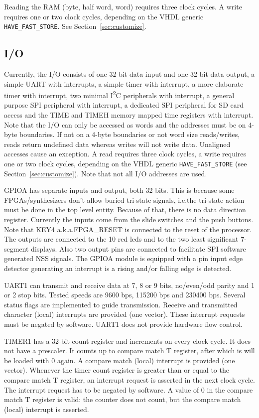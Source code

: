 \documentclass[12pt]{article}
\begin{document}
Reading the RAM (byte, half word, word) requires three clock cycles. A write requires one or two clock cycles, depending on the VHDL generic \lstinline|HAVE_FAST_STORE|. See Section~\ref{sec:customize}.

\subsection{I/O}
\label{sec/io}
Currently, the I/O consists of one 32-bit data input and one 32-bit data output, a simple UART with interrupts, a simple timer with interrupt, a more elaborate timer with interrupt, two minimal I\textsuperscript{2}C peripherals with interrupt, a general purpose SPI peripheral with interrupt, a dedicated SPI peripheral for SD card access and the TIME and TIMEH memory mapped time registers with interrupt. Note that the I/O can only be accessed as words and the addresses must be on 4-byte boundaries. If not on a 4-byte boundaries or not word size reads/writes, reads return undefined data whereas writes will not write data. Unaligned accesses cause an exception. A read requires three clock cycles, a write requires one or two clock cycles, depending on the VHDL generic \lstinline|HAVE_FAST_STORE| (see Section~\ref{sec:customize}). Note that not all I/O addresses are used.

GPIOA has separate inputs and output, both 32 bits. This is because some FPGAs/synthesizers don't allow buried tri-state signals, i.e.\@ the tri-state action must be done in the top level entity. Because of that, there is no data direction register. Currently the inputs come from the slide switches and the push buttons. Note that KEY4 a.k.a.\@ FPGA\_RESET is connected to the reset of the processor. The outputs are connected to the 10 red leds and to the two least significant 7-segment displays. Also two output pins are connected to facilitate SPI software generated NSS signals. The GPIOA module is equipped with a pin input edge detector generating an interrupt is a rising and/or falling edge is detected.

UART1 can transmit and receive data at 7, 8 or 9 bits, no/even/odd parity and 1 or 2 stop bits. Tested speeds are 9600 bps, 115200 bps and 230400 bps. Several status flags are implemented to guide transmission. Receive and transmitted character (local) interrupts are provided (one vector). These interrupt requests must be negated by software. UART1 does not provide hardware flow control.

TIMER1 has a 32-bit count register and increments on every clock cycle. It does not have a prescaler. It counts up to compare match T register, after which is will be loaded with 0 again. A compare match (local) interrupt is provided (one vector). Whenever the timer count register is greater than or equal to the compare match T register, an interrupt request is asserted in the next clock cycle. The interrupt request has to be negated by software. A value of 0 in the compare match T register is valid: the counter does not count, but the compare match (local) interrupt is asserted.
\end{document}
